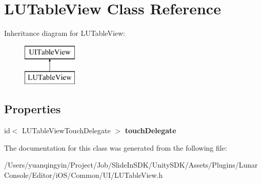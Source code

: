 \hypertarget{interface_l_u_table_view}{}\section{L\+U\+Table\+View Class Reference}
\label{interface_l_u_table_view}
Inheritance diagram for L\+U\+Table\+View\+:\begin{figure}[H]
\begin{center}
\leavevmode
\includegraphics[height=2.000000cm]{interface_l_u_table_view}
\end{center}
\end{figure}
\subsection*{Properties}
\begin{DoxyCompactItemize}
\item 
\mbox{\label{interface_l_u_table_view_a16be11c6942efb89467423825e4bc9dd}} 
id$<$ L\+U\+Table\+View\+Touch\+Delegate $>$ {\bfseries touch\+Delegate}
\end{DoxyCompactItemize}


The documentation for this class was generated from the following file\+:\begin{DoxyCompactItemize}
\item 
/\+Users/yuanqingyin/\+Project/\+Job/\+Slide\+In\+S\+D\+K/\+Unity\+S\+D\+K/\+Assets/\+Plugins/\+Lunar\+Console/\+Editor/i\+O\+S/\+Common/\+U\+I/L\+U\+Table\+View.\+h\end{DoxyCompactItemize}

